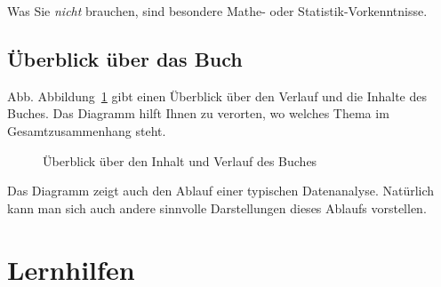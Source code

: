 \documentclass[
  letterpaper,
]{scrbook}
\theoremstyle{definition}
\theoremstyle{definition}
\theoremstyle{definition}
\theoremstyle{remark}
\begin{document}
Was Sie \emph{nicht} brauchen, sind besondere Mathe- oder
Statistik-Vorkenntnisse.

\subsection{Überblick über das
Buch}\label{uxfcberblick-uxfcber-das-buch}

Abb. Abbildung~\ref{fig-ueberblick} gibt einen Überblick über den
Verlauf und die Inhalte des Buches. Das Diagramm hilft Ihnen zu
verorten, wo welches Thema im Gesamtzusammenhang steht.

\begin{figure}


\caption{\label{fig-ueberblick}Überblick über den Inhalt und Verlauf des
Buches}

\end{figure}%

Das Diagramm zeigt auch den Ablauf einer typischen Datenanalyse.
Natürlich kann man sich auch andere sinnvolle Darstellungen dieses
Ablaufs vorstellen.

\section{Lernhilfen}\label{lernhilfen}
\end{document}
